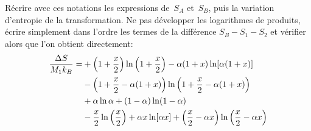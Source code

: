 \question
Récrire avec ces notations les expressions de~$S_A$ et~$S_B$, puis la
variation d'entropie de la transformation. Ne pas développer les
logarithmes de produits, écrire simplement dans l'ordre les termes de la
différence $S_B - S_1 - S_2$ et vérifier alors que l'on obtient
directement:
\begin{align*}
{ \Delta S \over M_1 k_B} = &+ \left( 1 + {x\over 2} \right) \ln\left( 1
  + {x\over 2} \right) - \alpha (1+x) \ln [\alpha (1+x)] \\
  & -\left( 1 + {x\over 2} - \alpha(1+x) \right)
          \ln\left(1+ {x\over 2} - \alpha(1+x) \right) \\
          &+ \alpha \ln\alpha + (1-\alpha) \ln (1-\alpha) \\
          &- {x\over 2} \ln \left( {x\over 2} \right) + \alpha x \ln[\alpha x]
          + \left( {x\over 2} -\alpha x\right) \ln \left( {x\over 2}
          - \alpha x \right)
\end{align*}
